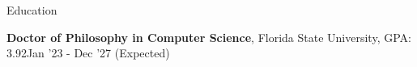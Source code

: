 \documentclass{resume} %
\begin{document}

\begin{rSection}{Education}

{\bf Doctor of Philosophy in Computer Science}, Florida State University, GPA: 3.92\hfill {Jan '23 - Dec '27 (Expected)}
\end{rSection}
\end{document}

